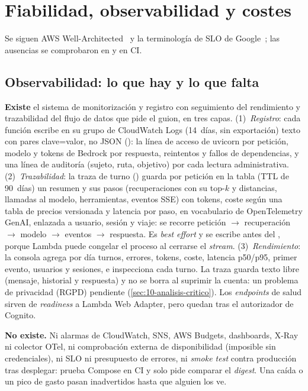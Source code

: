 \section{Fiabilidad, observabilidad y costes}\label{sec:09-sre}

Se siguen AWS Well-Architected~\cite{aws:wellarchitected} y la terminología de SLO de
Google~\cite{aws:srebook}; las ausencias se comprobaron en  y en CI.

\subsection{Observabilidad: lo que hay y lo que falta}

\textbf{Existe} el sistema de monitorización y registro con seguimiento del rendimiento y
trazabilidad del flujo de datos que pide el guion, en tres capas. (1)~\emph{Registro}: cada función
escribe en su grupo de CloudWatch Logs (14~días, sin exportación) texto con pares clave=valor, no
JSON (): la línea de acceso de uvicorn por petición, modelo y
tokens de Bedrock por respuesta, reintentos y fallos de dependencias, y una línea de auditoría
 (sujeto, ruta, objetivo) por cada lectura administrativa. (2)~\emph{Trazabilidad}:
la traza de turno () guarda por petición en la tabla  (TTL de
90~días) un resumen y sus pasos (recuperaciones con su top-$k$ y distancias, llamadas al modelo,
herramientas, eventos SSE) con tokens, coste según una tabla de precios versionada y latencia por
paso, en vocabulario de OpenTelemetry GenAI, enlazada a usuario, sesión y viaje: se recorre
petición $\to$ recuperación $\to$ modelo $\to$ eventos $\to$ respuesta. Es \emph{best effort} y se
escribe antes del \code{[DONE]}, porque Lambda puede congelar el proceso al cerrarse el
\emph{stream}. (3)~\emph{Rendimiento}: la consola  agrega por día turnos, errores,
tokens, coste, latencia p50/p95, primer evento, usuarios y sesiones, e inspecciona cada turno.
La traza guarda texto libre (mensaje, historial y respuesta) y no se borra al suprimir la cuenta:
un problema de privacidad (RGPD) pendiente (\cref{sec:10-analisis-critico}). Los \emph{endpoints}
de salud sirven de \emph{readiness} a Lambda Web Adapter, pero quedan tras el autorizador de
Cognito.

\textbf{No existe.} Ni alarmas de CloudWatch, SNS, AWS Budgets, dashboards, X-Ray ni colector
OTel, ni comprobación externa de disponibilidad (imposible sin credenciales), ni SLO ni
presupuesto de errores, ni \emph{smoke test} contra producción tras desplegar: 
prueba Compose en CI y  solo pide comparar el \emph{digest}. Una caída o un
pico de gasto pasan inadvertidos hasta que alguien los ve.

